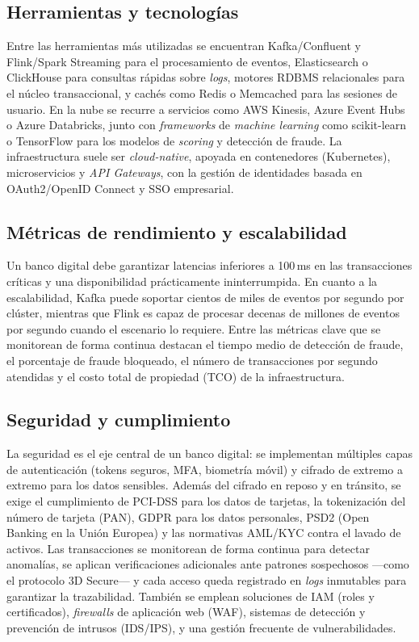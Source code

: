 \documentclass[12pt,a4paper]{article}
\begin{document}
\subsection{Herramientas y tecnologías}
Entre las herramientas más utilizadas se encuentran Kafka/Confluent y
Flink/Spark Streaming para el procesamiento de eventos, Elasticsearch o
ClickHouse para consultas rápidas sobre \textit{logs}, motores RDBMS
relacionales para el núcleo transaccional, y cachés como Redis o Memcached
para las sesiones de usuario. En la nube se recurre a servicios como AWS
Kinesis, Azure Event Hubs o Azure Databricks, junto con \textit{frameworks}
de \textit{machine learning} como scikit-learn o TensorFlow para los modelos
de \textit{scoring} y detección de fraude. La infraestructura suele ser
\textit{cloud-native}, apoyada en contenedores (Kubernetes), microservicios y
\textit{API Gateways}, con la gestión de identidades basada en
OAuth2/OpenID Connect y SSO empresarial.

\subsection{Métricas de rendimiento y escalabilidad}
Un banco digital debe garantizar latencias inferiores a 100\,ms en las
transacciones críticas y una disponibilidad prácticamente ininterrumpida.
En cuanto a la escalabilidad, Kafka puede soportar cientos de miles de
eventos por segundo por clúster, mientras que Flink es capaz de procesar
decenas de millones de eventos por segundo cuando el escenario lo requiere.
Entre las métricas clave que se monitorean de forma continua destacan el
tiempo medio de detección de fraude, el porcentaje de fraude bloqueado, el
número de transacciones por segundo atendidas y el costo total de propiedad
(TCO) de la infraestructura.

\subsection{Seguridad y cumplimiento}
La seguridad es el eje central de un banco digital: se implementan múltiples
capas de autenticación (tokens seguros, MFA, biometría móvil) y cifrado de
extremo a extremo para los datos sensibles. Además del cifrado en reposo y en
tránsito, se exige el cumplimiento de PCI-DSS para los datos de tarjetas, la
tokenización del número de tarjeta (PAN), GDPR para los datos personales,
PSD2 (Open Banking en la Unión Europea) y las normativas AML/KYC contra el
lavado de activos. Las transacciones se monitorean de forma continua para
detectar anomalías, se aplican verificaciones adicionales ante patrones
sospechosos —como el protocolo 3D Secure— y cada acceso queda registrado en
\textit{logs} inmutables para garantizar la trazabilidad. También se emplean
soluciones de IAM (roles y certificados), \textit{firewalls} de aplicación
web (WAF), sistemas de detección y prevención de intrusos (IDS/IPS), y una
gestión frecuente de vulnerabilidades.
\end{document}
